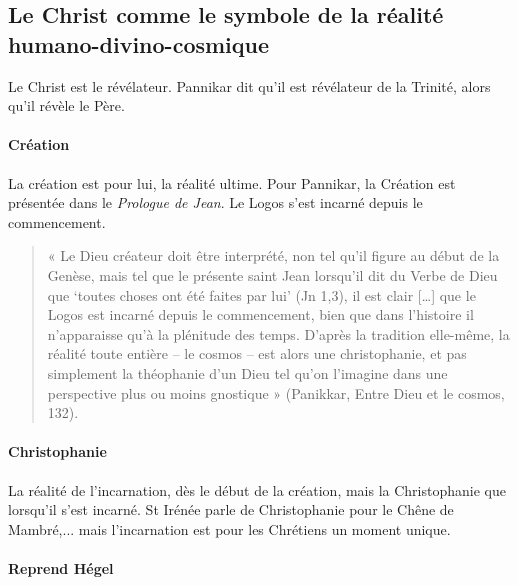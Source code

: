 \subsection{Le Christ comme le symbole de la réalité humano-divino-cosmique}

Le Christ est le révélateur. Pannikar dit qu'il est révélateur de la Trinité, alors qu'il révèle le Père. 
\paragraph{Création} La création est pour lui, la réalité ultime. Pour Pannikar, la Création est présentée dans le \textit{Prologue de Jean}. Le Logos s'est incarné depuis le commencement. 



\begin{quote}
    
« Le Dieu créateur doit être interprété, non tel qu’il figure au début de la Genèse, mais tel que 
le présente saint Jean lorsqu’il dit du Verbe de Dieu que ‘toutes choses ont été faites par lui’ 
(Jn 1,3), il est clair […] que le Logos est incarné depuis le commencement, bien que dans
l’histoire il n’apparaisse qu’à la plénitude des temps. D’après la tradition elle-même, la réalité 
toute entière – le cosmos – est alors une christophanie, et pas simplement la théophanie d’un Dieu 
tel qu’on l’imagine dans une perspective plus ou moins gnostique » (Panikkar, Entre Dieu et le 
cosmos, 132).
\end{quote}

\paragraph{Christophanie} La réalité de l'incarnation, dès le début de la création, mais la Christophanie que lorsqu'il s'est incarné. 
St Irénée parle de Christophanie pour le Chêne de Mambré,... mais l'incarnation est pour les Chrétiens un moment unique.

\paragraph{Reprend Hégel}


